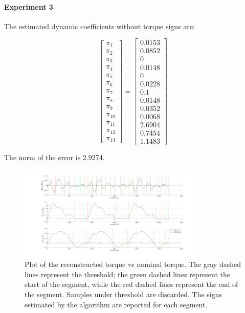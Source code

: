 \documentclass{article}
\begin{document}
\pagebreak

\paragraph{Experiment 3} The estimated dynamic coefficients without torque signs are:

\[\begin{bmatrix}
\pi_1 \\ \pi_2 \\ \pi_3 \\ \pi_4 \\ \pi_5 \\ \pi_6 \\ \pi_7 \\ \pi_8 \\  \pi_9 \\ \pi_{10} \\ \pi_{11} \\ \pi_{12} \\ \pi_{13}
\end{bmatrix}=\begin{bmatrix}
0.0153 \\ 0.0852 \\ 0 \\ 0.0148 \\ 0 \\ 0.0228 \\ 0.1 \\ 0.0148 \\ 0.0352 \\ 0.0068 \\ 2.6904 \\ 0.7454 \\ 1.1483
\end{bmatrix}\]

The norm of the error is 2.9274.

\begin{figure}[!htbp]
\centering
\includegraphics[width=0.8\textwidth]{images/3-dof/results_experiment3.png}
\caption{Plot of the reconstructed torque vs nominal torque. The gray dashed lines represent the threshold; the green dashed lines represent the start of the segment, while the red dashed lines represent the end of the segment. Samples under threshold are discarded. The signs estimated by the algorithm are reported for each segment.}
\end{figure}
\FloatBarrier
\end{document}
